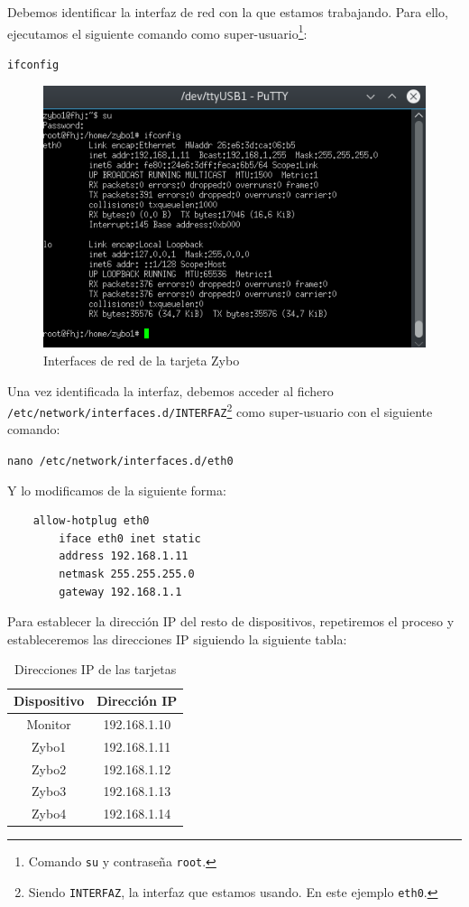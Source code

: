 \begin{itemize}
	Debemos identificar la interfaz de red con la que estamos trabajando. Para ello, ejecutamos el siguiente comando como super-usuario\footnote{Comando \texttt{su} y contraseña \texttt{root}.}:
	\begin{center}
		\texttt{ifconfig}
	\end{center}
	\newpage
	\begin{figure}[h]
		\centering
		\includegraphics[scale=0.8]{Anexos/Anexo2/Infraestructura/ifconfigZybo.png}
		\caption{Interfaces de red de la tarjeta Zybo}
		\label{Interfaces de red de la tarjeta Zybo}
	\end{figure}
	
	Una vez identificada la interfaz, debemos acceder al fichero\\ \texttt{/etc/network/interfaces.d/INTERFAZ}\footnote{Siendo \texttt{INTERFAZ}, la interfaz que estamos usando. En este ejemplo \texttt{eth0}.} como super-usuario con el siguiente comando:
	\begin{center}
		\texttt{nano /etc/network/interfaces.d/eth0}
	\end{center}
	Y lo modificamos de la siguiente forma:
	\begin{lstlisting}
	allow-hotplug eth0
	    iface eth0 inet static
	    address 192.168.1.11
	    netmask 255.255.255.0
	    gateway 192.168.1.1
	\end{lstlisting}
	\newpage
	Para establecer la dirección IP del resto de dispositivos, repetiremos el proceso y estableceremos las direcciones IP siguiendo la siguiente tabla:
	\begin{table}[h]
		\centering
		\begin{tabular}{|c|c|}
			\hline
			\textbf{Dispositivo} & \textbf{Dirección IP} \\ \hline
			Monitor & 192.168.1.10 \\ \hline
			Zybo1 & 192.168.1.11 \\ \hline
			Zybo2 & 192.168.1.12 \\ \hline
			Zybo3 & 192.168.1.13 \\ \hline
			Zybo4 & 192.168.1.14 \\ \hline
		\end{tabular}
		\caption{Direcciones IP de las tarjetas}
		\label{Direcciones IP de las tarjetas}
	\end{table}
	

\end{itemize}

